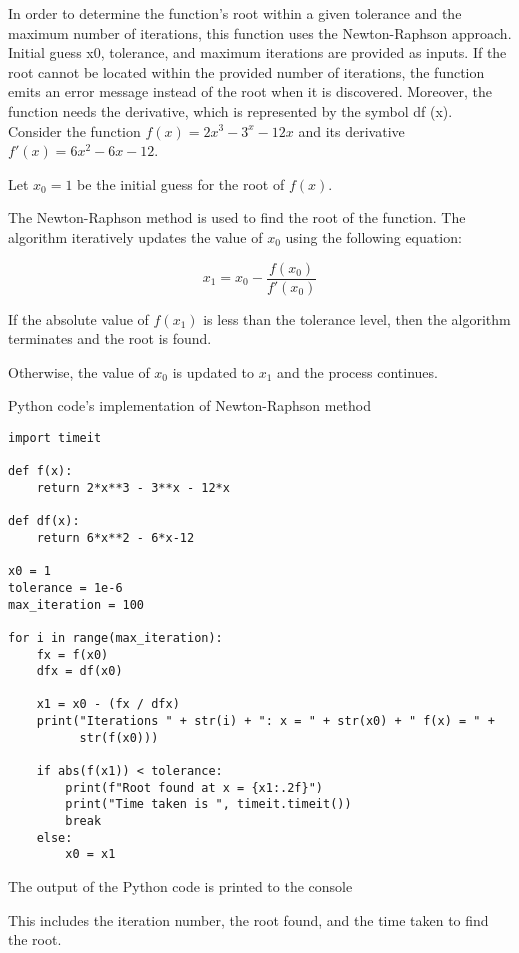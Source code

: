 \documentclass{article}
\begin{document}
In order to determine the function's root within a given tolerance and the maximum number of iterations, this function uses the Newton-Raphson approach. Initial guess x0, tolerance, and maximum iterations are provided as inputs. If the root cannot be located within the provided number of iterations, the function emits an error message instead of the root when it is discovered. Moreover, the function needs the derivative, which is represented by the symbol df (x).\\

Consider the function $f(x) = 2x^3 - 3^x - 12x$ and its derivative $f'(x) = 6x^2 - 6x - 12$.

Let $x_0 = 1$ be the initial guess for the root of $f(x)$.

The Newton-Raphson method is used to find the root of the function. The algorithm iteratively updates the value of $x_0$ using the following equation:

$$ x_1 = x_0 - \frac{f(x_0)}{f'(x_0)} $$

If the absolute value of $f(x_1)$ is less than the tolerance level, then the algorithm terminates and the root is found.

Otherwise, the value of $x_0$ is updated to $x_1$ and the process continues.

Python code's implementation of Newton-Raphson method 

\begin{verbatim}
import timeit

def f(x):
    return 2*x**3 - 3**x - 12*x

def df(x):
    return 6*x**2 - 6*x-12

x0 = 1
tolerance = 1e-6
max_iteration = 100

for i in range(max_iteration):
    fx = f(x0)
    dfx = df(x0)
    
    x1 = x0 - (fx / dfx)
    print("Iterations " + str(i) + ": x = " + str(x0) + " f(x) = " +    
          str(f(x0)))
    
    if abs(f(x1)) < tolerance:
        print(f"Root found at x = {x1:.2f}")
        print("Time taken is ", timeit.timeit())
        break
    else:
        x0 = x1
\end{verbatim}

The output of the Python code is printed to the console

This includes the iteration number, the root found, and the time taken to find the root.
\end{document}
